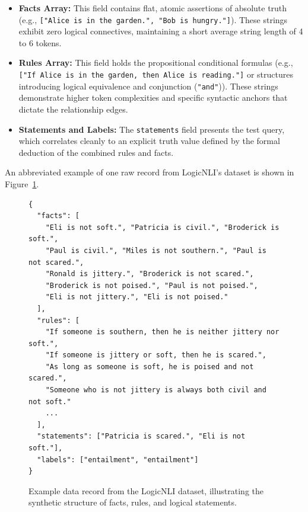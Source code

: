 \documentclass[12 pt]{article}  %
\begin{document}
\begin{itemize}
    \item \textbf{Facts Array:} This field contains flat, atomic assertions of 
    absolute truth (e.g., \texttt{["Alice is in the garden.", 
    "Bob is hungry."]}).
    These strings exhibit zero logical connectives, 
    maintaining a short average string length of 4 to 6 tokens.
    \item \textbf{Rules Array:} This field holds the propositional conditional 
    formulas (e.g., \texttt{["If Alice is in the garden, then Alice is 
    reading."]} or structures introducing logical equivalence and 
    conjunction (\texttt{"and"})).
    These strings demonstrate higher token 
    complexities and specific syntactic anchors that dictate the relationship 
    edges.
    \item \textbf{Statements and Labels:} The \texttt{statements} field 
    presents the test query, which correlates cleanly to an explicit truth 
    value defined by the formal deduction of the combined rules and facts.
\end{itemize}

An abbreviated example of one raw record from LogicNLI's dataset is shown in 
Figure~\ref{fig:logicnli-example}.

\begin{figure}[h!tbp]
    \centering
    \begin{small}
    \begin{verbatim}
{
  "facts": [
    "Eli is not soft.", "Patricia is civil.", "Broderick is soft.", 
    "Paul is civil.", "Miles is not southern.", "Paul is not scared.", 
    "Ronald is jittery.", "Broderick is not scared.", 
    "Broderick is not poised.", "Paul is not poised.", 
    "Eli is not jittery.", "Eli is not poised."
  ],
  "rules": [
    "If someone is southern, then he is neither jittery nor soft.",
    "If someone is jittery or soft, then he is scared.",
    "As long as someone is soft, he is poised and not scared.",
    "Someone who is not jittery is always both civil and not soft."
    ...
  ],
  "statements": ["Patricia is scared.", "Eli is not soft."],
  "labels": ["entailment", "entailment"]
}
    \end{verbatim}
    \end{small}
    \caption{Example data record from the LogicNLI dataset, illustrating the 
    synthetic structure of facts, rules, and logical statements.}
    \label{fig:logicnli-example}
\end{figure}
\end{document}
